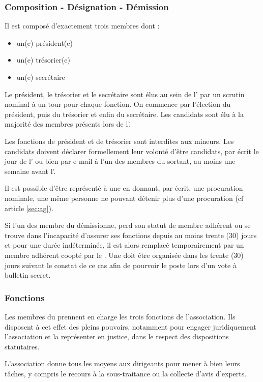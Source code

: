 \documentclass[a4paper,french,10pt]{article}
\newcounter{article}
\newcommand{\artref}[1]{article \ref{#1}}
\begin{document}
\subsubsection*{Composition - Désignation - Démission}
\label{sec:comp-design}
Il est composé d'exactement trois membres dont :
\begin{itemize}
\item un(e) président(e)
\item un(e) trésorier(e)
\item un(e) secrétaire
\end{itemize}

Le président, le trésorier et le secrétaire sont élus au sein de l'\AG{} par un scrutin nominal à un tour pour chaque fonction. On commence par l'élection du président, puis du trésorier et enfin du secrétaire.  Les candidats sont élu à la majorité des membres présents lors de l'\AG{}.

Les fonctions de président et de trésorier sont interdites aux mineurs. Les candidats doivent déclarer formellement leur volonté d'être candidats, par écrit le jour de l'\AG{} ou bien par e-mail à l'un des membres du \bureau{} sortant, au moins une semaine avant l'\AG{}.


Il est possible d’être représenté à une \AG{} en donnant, par écrit, une procuration nominale, une même personne ne pouvant détenir plus
d’une procuration (cf \artref{sec:ag}).

Si l'un des membre du \bureau{} démissionne, perd son statut de membre adhérent ou se trouve dans l'incapacité d'assurer ses fonctions depuis au moins trente (30) jours et pour une durée indéterminée, il est alors remplacé temporairement par un membre adhérent coopté par le \bureau{}. Une \AGE{} doit être organisée dans les trente (30) jours suivant le constat de ce cas afin de pourvoir le poste lors d'un vote à bulletin secret.

\subsubsection*{Fonctions}
\label{sec:fonctions}

Les membres du \bureau{} prennent en charge les trois fonctions de
l’association.  Ils disposent à cet effet des pleins pouvoirs,
notamment pour engager juridiquement l’association et la représenter
en justice, dans le respect des dispositions statutaires.

L’association donne tous les moyens aux dirigeants pour mener à bien
leurs tâches, y compris le recours à la sous-traitance ou la collecte
d’avis d’experts.
\end{document}
